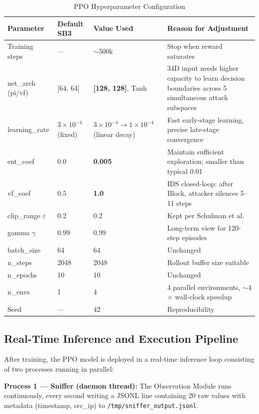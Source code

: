 \documentclass[12pt,a4paper]{report}
\begin{document}
\begin{table}[h!]
\centering
\caption{PPO Hyperparameter Configuration}
\begin{tabular}{L{3.5cm} C{2.5cm} C{2.5cm} L{4.5cm}}
\toprule
\textbf{Parameter} & \textbf{Default SB3} & \textbf{Value Used} & \textbf{Reason for Adjustment} \\
\midrule
Training steps & --- & $\sim$500k & Stop when reward saturates \\
net\_arch (pi/vf) & {[}64, 64{]} & \textbf{[128, 128]}, Tanh & 34D input needs higher capacity to learn decision boundaries across 5 simultaneous attack subspaces \\
learning\_rate & $3\times10^{-4}$ (fixed) & $3\times10^{-4} \to 1\times10^{-4}$ (linear decay) & Fast early-stage learning, precise late-stage convergence \\
ent\_coef & 0.0 & \textbf{0.005} & Maintain sufficient exploration; smaller than typical 0.01 \\
vf\_coef & 0.5 & \textbf{1.0} & IDS closed-loop: after Block, attacker silences 5--11 steps \\
clip\_range $\varepsilon$ & 0.2 & 0.2 & Kept per Schulman et al.\ \cite{schulmanPPO2017} \\
gamma $\gamma$ & 0.99 & 0.99 & Long-term view for 120-step episodes \\
batch\_size & 64 & 64 & Unchanged \\
n\_steps & 2048 & 2048 & Rollout buffer size suitable \\
n\_epochs & 10 & 10 & Unchanged \\
n\_envs & 1 & 4 & 4 parallel environments, $\sim$4$\times$ wall-clock speedup \\
Seed & --- & 42 & Reproducibility \\
\bottomrule
\end{tabular}
\end{table}

\subsection{Real-Time Inference and Execution Pipeline}

After training, the PPO model is deployed in a real-time inference loop consisting of two processes running in parallel:

\textbf{Process 1 --- Sniffer (daemon thread):} The Observation Module runs continuously, every second writing a JSONL line containing 20 raw values with metadata (timestamp, src\_ip) to \texttt{/tmp/sniffer\_output.jsonl}.
\end{document}
